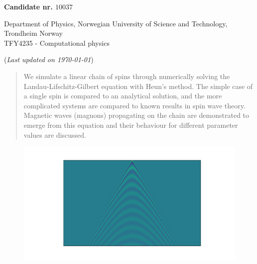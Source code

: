 


	
\begin{titlepage}
	\begin{center}
	\setlength{\parskip}{0em}
	\thispagestyle{titlepage}
	

	\vspace{4mm}
	
	\large{\textbf{Candidate nr. $10037$}}
	
	\normalsize{Department of Physics, Norwegian University of Science and Technology, Trondheim Norway \\
	TFY4235 - Computational physics
	}

	(\textit{Last updated on \today})
	\end{center}

	\setlength{\parindent}{2em}
		\begin{abstract}
		We simulate a linear chain of spins through numerically solving the Landau-Lifschitz-Gilbert equation with Heun's method. The simple case of a single spin is compared to an analytical solution, and the more complicated systems are compared to known results in spin wave theory. Magnetic waves (magnons) propagating on the chain are demonstrated to emerge from this equation and their behaviour for different parameter values are discussed.
		\end{abstract}
	\begin{figure}[htb]
		\centering
		\includegraphics[width=\columnwidth]{../fig/front_fig.pdf}
	\end{figure}
	

\end{titlepage}

\newpage
\setlength{\parskip}{0em}
\tableofcontents
\setlength{\parskip}{1em}
\newpage


